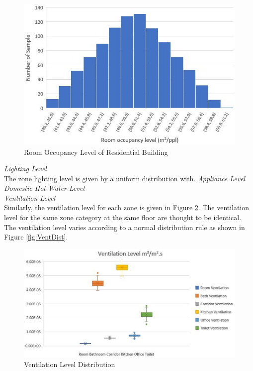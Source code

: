 \documentclass[a4paper, oneside]{discothesis}
\begin{document}
			\begin{figure}[h!]
			\centering
			\includegraphics[scale=0.9]{figures/RoomOccupancy.JPG}
			\caption{Room Occupancy Level of Residential Building}
			\label{fig:HonggRoomOcc}
			\end{figure}
			
		\textit{Lighting Level}\\
			The zone lighting level is given by a uniform distribution with.
		\textit{Appliance Level}\\

		\textit{Domestic Hot Water Level}\\


		\textit{Ventilation Level}\\
			Similarly, the ventilation level for each zone is given in Figure \ref{fig:VentLevel}. The ventilation level for the same zone category at the same floor are thought to be identical. The ventilation level varies according to a normal distribution rule as shown in Figure \ref{fig:VentDist}.\\

			\begin{figure}[ht!]
			\centering
			\includegraphics[scale=0.55]{VentilationLevel.jpg}
			\caption{Ventilation Level Distribution}
			\label{fig:VentLevel}
			\end{figure}
\end{document}
